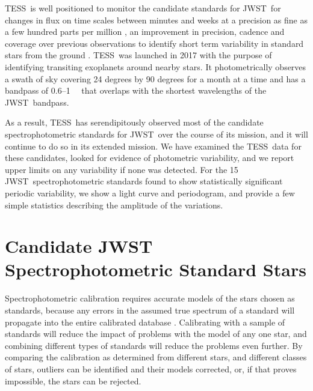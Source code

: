 \documentclass[twocolumn]{aastex631}
\newcommand{\webb}{JWST}
\newcommand{\jwst}{JWST}
\newcommand{\tess}{TESS}
\newcommand{\mum}{\ifmmode{\rm \mu m}\else{$\mu$m}\fi}
\begin{document}
\tess\ is well positioned to monitor the candidate standards for \webb\ for changes in flux on time scales between minutes and weeks at a precision as fine as a few hundred parts per million \citep{Ricker2015}, an improvement in precision, cadence and coverage over previous observations to identify short term variability in standard stars from the ground \citep[e.g.][]{Marinoni2016}.  \tess\ was launched in 2017 with the purpose of identifying transiting exoplanets around nearby stars.  It photometrically observes a swath of sky covering 24 degrees by 90 degrees for a month at a time and has a bandpass of 0.6--1~\mum\ \citep{Ricker2015} that overlaps with the shortest wavelengths of the \webb\ bandpass.

As a result, \tess\ has serendipitously observed most of the candidate spectrophotometric standards for \webb\ over the course of its mission, and it will continue to do so in its extended mission.  We have examined the \tess\ data for these candidates, looked for evidence of photometric variability, and we report upper limits on any variability if none was detected.  For the 15 \jwst\ spectrophotometric standards found to show statistically significant periodic variability, we show a light curve and periodogram, and provide a few simple statistics describing the amplitude of the variations. 



\section{Candidate JWST Spectrophotometric Standard Stars} 
\label{sec:targets}

Spectrophotometric calibration requires accurate models of the stars chosen as standards, because any errors in the assumed true spectrum of a standard will propagate into the entire calibrated database \citep{Gordon2022inprep}.  Calibrating with a sample of standards will reduce the impact of problems with the model of any one star, and combining different types of standards will reduce the problems even further.  By comparing the calibration as determined from different stars, and different classes of stars, outliers can be identified and their models corrected, or, if that proves impossible, the stars can be rejected.
\end{document}
